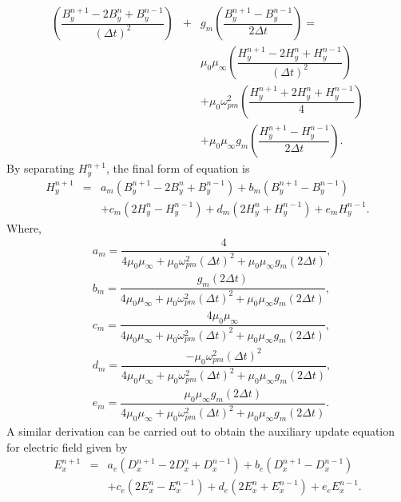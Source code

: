 \begin{eqnarray}
\nonumber \left(\dfrac{B^{n+1}_y-2B^n_y+B^{n-1}_y}{(\Delta t)^2}\right) &+& g_m\left(\dfrac{B^{n+1}_y-B^{n-1}_y}{2\Delta t}\right) =\\
\nonumber &&\mu_0\mu_\infty\left(\dfrac{H^{n+1}_y-2H^n_y+H^{n-1}_y}{(\Delta t)^2}\right)\\
\nonumber &&+\mu_0\omega^2_{pm}\left(\dfrac{H^{n+1}_y+2H^n_y+H^{n-1}_y}{4}\right)\\
&&+\mu_0\mu_\infty g_m\left(\dfrac{H^{n+1}_y-H^{n-1}_y}{2\Delta t}\right).
\label{2nd-order-B-H}
\end{eqnarray}
By separating $H^{n+1}_y$, the final form of equation is
\begin{eqnarray}
\nonumber H^{n+1}_y &=& a_m\left(B^{n+1}_y-2B^n_y+B^{n-1}_y\right)+b_m\left(B^{n+1}_y-B^{n-1}_y\right)\\
&&+c_m\left(2H^n_y-H^{n-1}_y\right)+d_m\left(2H^n_y+H^{n-1}_y\right)+e_m H^{n-1}_y.
\label{2nd-order-B-H-final-form}
\end{eqnarray}
Where,
\begin{eqnarray}
\nonumber & a_m=\dfrac{4}{4\mu_0\mu_\infty+\mu_0\omega^2_{pm}\left(\Delta t\right)^2+\mu_0\mu_\infty g_m \left(2\Delta t\right)},\\
\nonumber & b_m=\dfrac{g_m\left(2\Delta t\right)}{4\mu_0\mu_\infty+\mu_0\omega^2_{pm}\left(\Delta t\right)^2+\mu_0\mu_\infty g_m \left(2\Delta t\right)},\\
\nonumber & c_m=\dfrac{4\mu_0\mu_\infty}{4\mu_0\mu_\infty+\mu_0\omega^2_{pm}\left(\Delta t\right)^2+\mu_0\mu_\infty g_m \left(2\Delta t\right)},\\
\nonumber & d_m=\dfrac{-\mu_0\omega^2_{pm}\left(\Delta t\right)^2}{4\mu_0\mu_\infty+\mu_0\omega^2_{pm}\left(\Delta t\right)^2+\mu_0\mu_\infty g_m \left(2\Delta t\right)},\\
\nonumber & e_m=\dfrac{\mu_0\mu_\infty g_m\left(2\Delta t\right)}{4\mu_0\mu_\infty+\mu_0\omega^2_{pm}\left(\Delta t\right)^2+\mu_0\mu_\infty g_m \left(2\Delta t\right)}.
\label{1D-Drude-H-scalars}
\end{eqnarray}
A similar derivation can be carried out to obtain the auxiliary update equation for electric field given by
\begin{eqnarray}
\nonumber E^{n+1}_x &=& a_e\left(D^{n+1}_x-2D^n_x+D^{n-1}_x\right)+b_e\left(D^{n+1}_x-D^{n-1}_x\right)\\
&&+c_e\left(2E^n_x-E^{n-1}_x\right)+d_e\left(2E^n_x+E^{n-1}_x\right)+e_e E^{n-1}_x.
\label{2nd-order-D-E-final-form}
\end{eqnarray}
